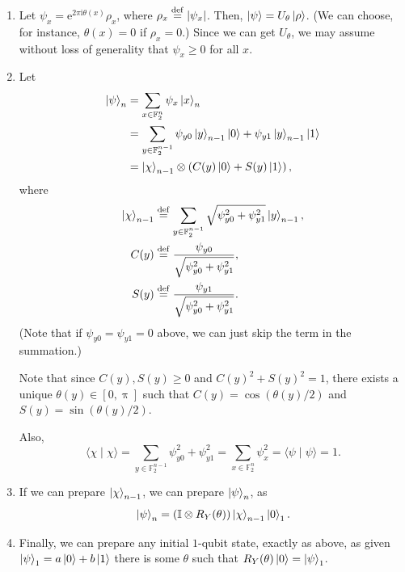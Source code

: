 \documentclass[12pt]{amsart}
\theoremstyle{plain}
\theoremstyle{definition}
\theoremstyle{remark}
\newcommand{\F}{\mathbb{F}}
\newcommand{\me}{\mathrm{e}}
\newcommand{\mi}{\mathrm{i}}
\newcommand{\mpi}{\uppi}
\newcommand{\idef}{\overset{{\rm def}}{=}}
\newcommand{\abs}[1]{\left| #1 \right|}
\newcommand{\idt}{\mathbb{I}}
\begin{document}
\begin{enumerate}

\item Let $\psi_x = \me^{2 \pi\mi \theta(x)} \rho_x$, where $\rho_x \idef \abs{\psi_x}$.  Then, $\ket{\psi} = U_{\theta} \ket{\rho}$.  (We can choose, for instance, $\theta(x) = 0$ if $\rho_x = 0$.)  Since we can get $U_\theta$, we may assume without loss of generality that $\psi_x \geq 0$ for all $x$.

\item Let
  \begin{align*}
    \ket{\psi}_n
    &= \sum_{x \in \F_2^n} \psi_x \ket{x}_n \\
    &= \sum_{y \in \F_2^{n-1}} \psi_{y0} \ket{y}_{n-1} \ket{0} +  \psi_{y1} \ket{y}_{n-1} \ket{1} \\
    &= \ket{\chi}_{n-1} \otimes \left( C(y) \ket{0} +  S(y) \ket{1} \right),
  \end{align*}
  where
  \begin{align*}
    \ket{\chi}_{n-1} &\idef \sum_{y \in \F_2^{n-1}} \sqrt{\psi_{y0}^2 + \psi_{y1}^2} \ket{y}_{n-1}, \\
    C(y) &\idef \frac{\psi_{y0}}{\sqrt{\psi_{y0}^2 + \psi_{y1}^2}}, \\
    S(y) & \idef \frac{\psi_{y1}}{\sqrt{\psi_{y0}^2 + \psi_{y1}^2}}.
  \end{align*}
  (Note that if $\psi_{y0} = \psi_{y1} = 0$ above, we can just skip the term in the summation.)

  Note that since $C(y), S(y) \geq 0$ and ${C(y)}^2 + {S(y)}^2 = 1$, there exists a unique $\theta(y) \in [0, \mpi]$ such that $C(y) = \cos(\theta(y)/2)$ and $S(y) = \sin(\theta(y)/2)$.

  Also,
  \[
    \langle \chi \mid \chi \rangle = \sum_{y \in \F_2^{n-1}} \psi_{y0}^2 + \psi_{y1}^2 = \sum_{x \in \F_2^n} \psi_x^2 = \langle \psi \mid \psi \rangle = 1.
  \]


\item If we can prepare $\ket{\chi}_{n-1}$, we can prepare $\ket{\psi}_n$, as
  \[
    \ket{\psi}_n = (\idt \otimes R_Y(\theta)) \ket{\chi}_{n-1} \ket{0}_1.
  \]

  \item Finally, we can prepare any initial $1$-qubit state, exactly as above, as given $\ket{\psi}_1 = a \ket{0} + b \ket{1}$ there is some $\theta$ such that $R_Y(\theta) \ket{0} = \ket{\psi}_1$.

\end{enumerate}

\printindex[not]
\printindex
\end{document}
